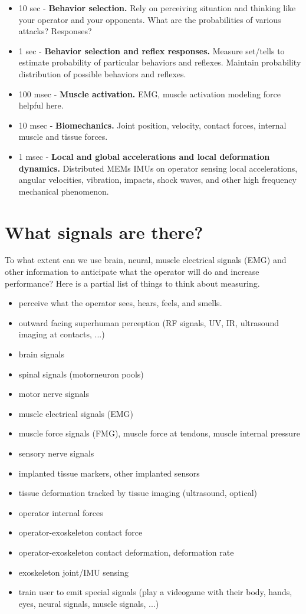 \documentclass[letterpaper,12pt,fullpage]{article}
\begin{document}
\begin{itemize}
\item
10 sec - {\bf Behavior selection.}
Rely on perceiving situation and thinking like your operator and your
opponents.
What are the probabilities of various attacks? Responses?
\item
1 sec - {\bf Behavior selection and reflex responses.}
Measure set/tells to estimate probability of particular behaviors and reflexes.
Maintain probability distribution of possible behaviors and reflexes.
\item
100 msec - {\bf Muscle activation.} EMG, muscle activation modeling
force helpful here.
\item
10 msec - {\bf Biomechanics.} Joint position, velocity, contact forces,
internal muscle and tissue forces.
\item
1 msec - {\bf Local and global accelerations and local deformation dynamics.}
Distributed MEMs IMUs on operator sensing local accelerations,
angular velocities, vibration, impacts, shock waves, and other high
frequency mechanical phenomenon.
\end{itemize}

\section{What signals are there?}

To what extent can we use brain, neural, muscle electrical signals
(EMG) and other information
to anticipate what the operator will do and increase performance?
Here is a partial list of things to think about measuring.

\begin{itemize}
\item
perceive what the operator sees, hears, feels, and smells.
\item
outward facing superhuman perception (RF signals, UV, IR, ultrasound
imaging at contacts, ...)
\item
brain signals
\item
spinal signals (motorneuron pools)
\item
motor nerve signals
\item
muscle electrical signals (EMG)
\item
muscle force signals (FMG), muscle force at tendons, muscle internal pressure
\item
sensory nerve signals
\item
implanted tissue markers, other implanted sensors
\item
tissue deformation tracked by tissue imaging (ultrasound, optical)
\item
operator internal forces
\item
operator-exoskeleton contact force
\item
operator-exoskeleton contact deformation, deformation rate
\item
exoskeleton joint/IMU sensing
\item
train user to emit special signals (play a videogame with their body,
hands, eyes, neural signals, muscle signals, ...)
\end{itemize}
\end{document}
